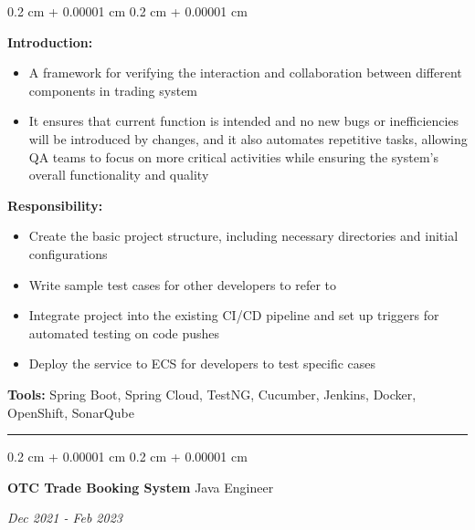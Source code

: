 \documentclass[10pt, letterpaper]{article}
\newenvironment{highlights}{
	\begin{itemize}[
		topsep=0.10 cm,
		parsep=0.10 cm,
		partopsep=0pt,
		itemsep=0pt,
		leftmargin=0.4 cm + 10pt
		]
	}{
	\end{itemize}
} %
\newenvironment{onecolentry}{
	\begin{adjustwidth}{
			0.2 cm + 0.00001 cm
		}{
			0.2 cm + 0.00001 cm
		}
	}{
	\end{adjustwidth}
} %
\newenvironment{twocolentry}[2][]{
	\onecolentry
	\def\secondColumn{#2}
	\setcolumnwidth{\fill, 4.5 cm}
	\begin{paracol}{2}
	}{
		\switchcolumn \raggedleft \secondColumn
	\end{paracol}
	\endonecolentry
} %
\begin{document}
			\vspace{0.10 cm}
			\begin{onecolentry}
				\textbf{Introduction:} 
				\begin{highlights}
					\item A framework for verifying the interaction and collaboration between different components in trading system
					\item It ensures that current function is intended and no new bugs or inefficiencies will be introduced by changes, and it also automates repetitive tasks, allowing QA teams to focus on more critical activities while ensuring the system's overall functionality and quality
				\end{highlights}
				\textbf{Responsibility:} 
				\begin{highlights}
					\item Create the basic project structure, including necessary directories and initial configurations
					\item Write sample test cases for other developers to refer to 
					\item Integrate project into the existing CI/CD pipeline and set up triggers for automated testing on code pushes
					\item Deploy the service to ECS for developers to test specific cases
				\end{highlights}
				\textbf{Tools:} Spring Boot, Spring Cloud, TestNG, Cucumber, Jenkins, Docker, OpenShift, SonarQube
			\end{onecolentry}
			\vspace{0.4 cm}
			\hrule
			\vspace{0.4 cm}
			\begin{twocolentry}{	
				\textit{Dec 2021 - Feb 2023}}
				\textbf{OTC Trade Booking System}
				\space\space\space\space\space\space\space\space\space\space\space\space Java Engineer
			\end{twocolentry}
			
\end{document}
